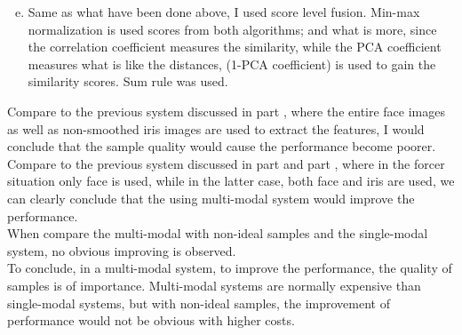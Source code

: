 \documentclass[a4paper]{article}
\begin{document}
\begin{spacing}{2.0}
	\begin{enumerate}[(a)]
	\setcounter{enumi}{4}
	\item Same as what have been done above, I used score level fusion. Min-max normalization is used scores from both algorithms; and what is more, since the correlation coefficient measures the similarity, while the PCA coefficient measures what is like the distances, (1-PCA coefficient) is used to gain the similarity scores. Sum rule was used.
	\end{enumerate}
	
	\noindent Compare to the previous system discussed in part \uppercase\expandafter{}, where the entire face images as well as non-smoothed iris images are used to extract the features, I would conclude that the sample quality would cause the performance become poorer.\\
	Compare to the previous system discussed in part \uppercase\expandafter{} and part \uppercase\expandafter{}, where in the forcer situation only face is used, while in the latter case, both face and iris are used, we can clearly conclude that the using multi-modal system would improve the performance.\\
	When compare the multi-modal with non-ideal samples and the single-modal system, no obvious improving is observed. \\
	To conclude, in a multi-modal system, to improve the performance, the quality of samples is of importance. Multi-modal systems are normally expensive than single-modal systems, but with non-ideal samples, the improvement of performance would not be obvious with higher costs. 

	
	


	
\end{spacing}
\end{document}
